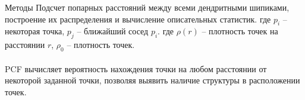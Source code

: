 \documentclass[final]{beamer}
\newlength{\colwidth}
\begin{document}
\begin{frame}[t]
\begin{columns}[t]
\begin{column}{\colwidth}
\begin{block}{Методы}
    Подсчет попарных расстояний между всеми дендритными шипиками, построение их распределения и вычисление описательных статистик. 
    где $p_i$ – некоторая точка, $p_j$ – ближайший сосед $p_i$. 
    где $\rho(r)$ – плотность точек на расстоянии $r$, $\rho_0$ – плотность точек.\\\\
    \vspace{0.5em} 
    PCF вычисляет вероятность нахождения точки на любом расстоянии от некоторой заданной точки, позволяя выявить наличие структуры в расположении точек.
    


\end{block}
\end{column}
\end{columns}
\end{frame}
\end{document}
